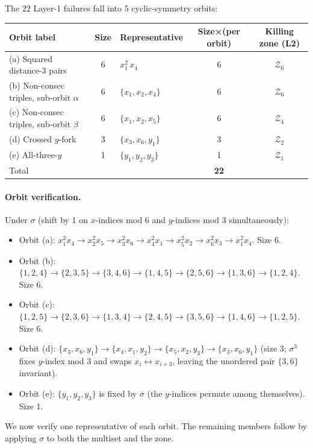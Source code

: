 \documentclass[11pt]{article}
\newcommand{\Z}{\mathcal{Z}}
\theoremstyle{definition}
\begin{document}
The $22$ Layer-1 failures fall into $5$ cyclic-symmetry orbits:

\begin{center}
\renewcommand{\arraystretch}{1.2}
\begin{tabular}{l|c|l|c|c}
\toprule
Orbit label & Size & Representative & Size×(per orbit) & Killing zone (L2) \\
\midrule
(a) Squared distance-3 pairs & 6 & $x_1^2\,x_4$ & 6 & $\Z_6$\\
(b) Non-consec triples, sub-orbit $\alpha$ & 6 & $\{x_1,x_2,x_4\}$ & 6 & $\Z_6$ \\
(c) Non-consec triples, sub-orbit $\beta$ & 6 & $\{x_1,x_2,x_5\}$ & 6 & $\Z_4$\\
(d) Crossed $y$-fork & 3 & $\{x_3,x_6,y_1\}$ & 3 & $\Z_2$\\
(e) All-three-$y$ & 1 & $\{y_1,y_2,y_3\}$ & 1 & $\Z_1$\\
\bottomrule
Total & & & \textbf{22} & \\
\end{tabular}
\end{center}

\paragraph{Orbit verification.} Under $\sigma$ (shift by 1 on $x$-indices mod
6 and $y$-indices mod 3 simultaneously):
\begin{itemize}[nosep,leftmargin=2em]
\item Orbit (a): $x_1^2 x_4 \to x_2^2 x_5 \to x_3^2 x_6 \to x_4^2 x_1 \to x_5^2 x_2 \to x_6^2 x_3 \to x_1^2 x_4$. Size 6.
\item Orbit (b): $\{1,2,4\}\to\{2,3,5\}\to\{3,4,6\}\to\{1,4,5\}\to\{2,5,6\}\to\{1,3,6\}\to\{1,2,4\}$. Size 6.
\item Orbit (c): $\{1,2,5\}\to\{2,3,6\}\to\{1,3,4\}\to\{2,4,5\}\to\{3,5,6\}\to\{1,4,6\}\to\{1,2,5\}$. Size 6.
\item Orbit (d): $\{x_3, x_6, y_1\}\to\{x_4, x_1, y_2\}\to\{x_5, x_2, y_3\}\to\{x_3, x_6, y_1\}$ (size 3; $\sigma^3$ fixes $y$-index mod 3 and swaps $x_i\leftrightarrow x_{i+3}$, leaving the unordered pair $\{3,6\}$ invariant).
\item Orbit (e): $\{y_1, y_2, y_3\}$ is fixed by $\sigma$ (the $y$-indices permute among themselves). Size 1.
\end{itemize}

We now verify one representative of each orbit. The remaining members
follow by applying $\sigma$ to both the multiset and the zone.
\end{document}

